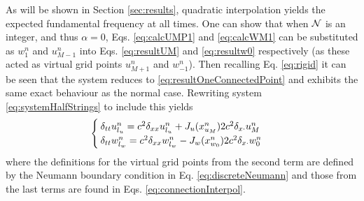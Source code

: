 As will be shown in Section \ref{sec:results}, quadratic interpolation yields the expected fundamental frequency at all times. One can show that when $\mathcal{N}$ is an integer, and thus $\alpha = 0$, Eqs. \eqref{eq:calcUMP1} and \eqref{eq:calcWM1} can be substituted as $w_1^n$ and $u_{M-1}^n$ into Eqs. \eqref{eq:resultUM} and \eqref{eq:resultw0} respectively (as these acted as virtual grid points $u_{M+1}^n$ and $w_{-1}^n$). Then recalling Eq. \eqref{eq:rigid} it can be seen that the system reduces to \eqref{eq:resultOneConnectedPoint} and exhibits the same exact behaviour as the normal case. %
Rewriting system \eqref{eq:systemHalfStrings} to include this yields
\begin{equation}\label{eq:FDSwithMethod}
    \begin{cases}
        \delta_{tt}u_{l_u}^n = c^2\delta_{xx}u_{l_u}^n + J_u(x_{u_M}^n)2c^2\delta_{x\cdot}u_M^n\\
        \delta_{tt}w_{l_w}^n = c^2\delta_{xx}w_{l_w}^n - J_w(x_{w_0}^n)2c^2\delta_{x\cdot}w_0^n
    \end{cases}
\end{equation}
where the definitions for the virtual grid points from the second term are defined by the Neumann boundary condition in Eq. \eqref{eq:discreteNeumann} and those from the last terms are found in Eqs. \eqref{eq:connectionInterpol}.


